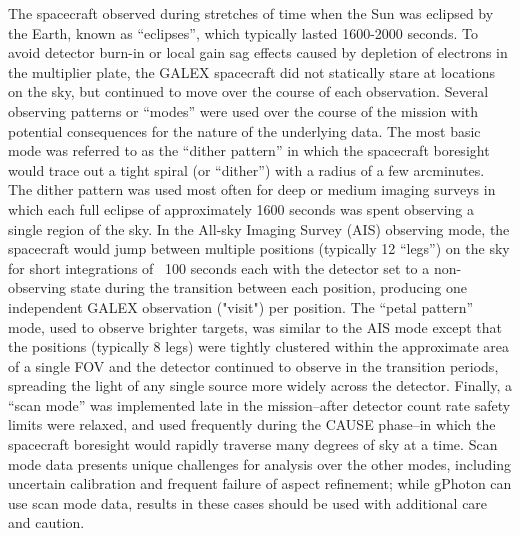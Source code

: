 \documentclass[preprint]{aastex}
\begin{document}
The spacecraft observed during stretches of time when the Sun was eclipsed by the Earth, known as ``eclipses'', which typically lasted 1600-2000 seconds. To avoid detector burn-in or local gain sag effects caused by depletion of electrons in the multiplier plate, the GALEX spacecraft did not statically stare at locations on the sky, but continued to move over the course of each observation. Several observing patterns or “modes” were used over the course of the mission with potential consequences for the nature of the underlying data. The most basic mode was referred to as the “dither pattern” in which the spacecraft boresight would trace out a tight spiral (or “dither”) with a radius of a few arcminutes. The dither pattern was used most often for deep or medium imaging surveys in which each full eclipse of approximately 1600 seconds was spent observing a single region of the sky. In the All-sky Imaging Survey (AIS) observing mode, the spacecraft would jump between multiple positions (typically 12 “legs”) on the sky for short integrations of ~100 seconds each with the detector set to a non-observing state during the transition between each position, producing one independent GALEX observation ("visit") per position. The “petal pattern” mode, used to observe brighter targets, was similar to the AIS mode except that the positions (typically 8 legs) were tightly clustered within the approximate area of a single FOV and the detector continued to observe in the transition periods, spreading the light of any single source more widely across the detector. Finally, a “scan mode” was implemented late in the mission--after detector count rate safety limits were relaxed, and used frequently during the CAUSE phase--in which the spacecraft boresight would rapidly traverse many degrees of sky at a time. Scan mode data presents unique challenges for analysis over the other modes, including uncertain calibration and frequent failure of aspect refinement; while gPhoton can use scan mode data, results in these cases should be used with additional care and caution.
\end{document}
